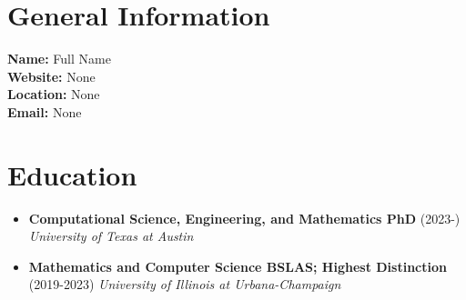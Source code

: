 \section*{General Information}
\textbf{Name:} Full Name \\
\textbf{Website:} None \\
\textbf{Location:} None \\
\textbf{Email:} None \\
\section*{Education}
\begin{itemize}
  \item \textbf{Computational Science, Engineering, and Mathematics PhD} (2023-)
    \textit{University of Texas at Austin}
  \item \textbf{Mathematics and Computer Science BSLAS; Highest Distinction} (2019-2023)
    \textit{University of Illinois at Urbana-Champaign}
\end{itemize}
